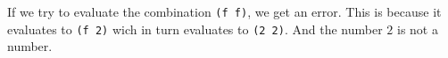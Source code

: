 \documentclass[a4paper,12pt]{article}
\begin{document}
If we try to evaluate the combination \lstinline!(f f)!, we get an
error.  This is because it evaluates to \lstinline!(f 2)! wich in turn
evaluates to \lstinline!(2 2)!.  And the number $2$ is not a number.
\end{document}

